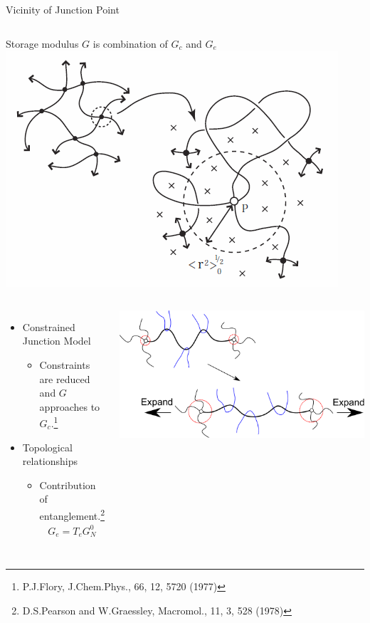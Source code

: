 \documentclass[aspectratio=169,11pt, dvipdfmx]{beamer}
\begin{document}
\begin{frame}
\begin{alertblock}{Vicinity of Junction Point}
\begin{columns}[totalwidth=1\textwidth]
                Storage modulus $G$ is \alert{combination of $G_c$ and $G_e$}
				\centering
				\includegraphics[width=\textwidth]{JP_vicinity.png}
			\end{columns}
		\end{alertblock}
			\begin{columns}[totalwidth=1\textwidth]
				\begin{itemize}
					\item Constrained Junction Model
					\begin{itemize}
						\item Constraints are reduced and $G$ approaches to $G_c$.\footnote{\tiny{P.J.Flory, J.Chem.Phys., 66, 12, 5720 (1977)}}
					\end{itemize}
					\item Topological relationships
					\begin{itemize}
						\item Contribution of entanglement.\footnote{\tiny{D.S.Pearson and W.Graessley, Macromol., 11, 3, 528 (1978)}}
						\vspace{-2mm}
						\scriptsize
						\begin{align*}
							G_e = T_e G_N^0
						\end{align*}
					\end{itemize}
				\end{itemize}
				\includegraphics[width=.85\textwidth]{Constrained_Juntion.pdf}


\end{columns}
\end{frame}
\end{document}
